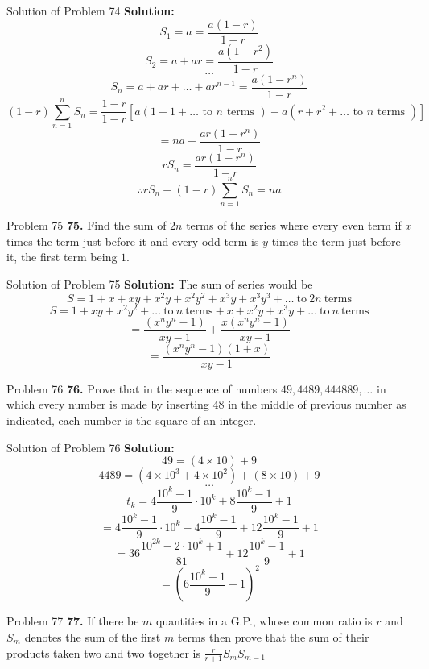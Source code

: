 \documentclass[aspectratio=1610,8pt]{beamer}
\begin{document}
\begin{frame}{Solution of Problem 74}
  \textbf{Solution:} $$S_1 = a = \frac{a(1 - r)}{1 - r}$$
  $$S_2 = a + ar = \frac{a(1 - r^2)}{1 - r}$$
  $$\ldots$$
  $$S_n = a + ar + \ldots + ar^{n - 1} = \frac{a(1 - r^n)}{1 - r}$$
  $$(1-r)\sum_{n = 1}^nS_n = \frac{1 - r}{1 - r}\left[a(1 + 1 + \ldots\text{~to~}n\text{~terms~}) -a (r + r^2 + \ldots
    \text{~to~}n\text{~terms~})\right]$$
  $$= na - \frac{ar(1 - r^n)}{1 - r}$$
  $$rS_n = \frac{ar(1 - r^n)}{1 - r}$$
  $$\therefore rS_n + (1 - r)\sum_{n = 1}^nS_n = na$$
\end{frame}
\begin{frame}{Problem 75}
  \textbf{75.} Find the sum of $2n$ terms of the series where every even term if $x$ times the term just before it and every odd
  term is $y$ times the term just before it, the first term being $1.$
\end{frame}
\begin{frame}{Solution of Problem 75}
  \textbf{Solution:} The sum of series would be $$S = 1 + x + xy + x^2y + x^2y^2 + x^3y + x^3y^3 + \ldots~\text{to}~2n~\text{terms}$$
  $$S = 1 + xy + x^2y^2 + \ldots~\text{to}~n~\text{terms} + x + x^2y + x^3y + \ldots~\text{to}~n~\text{terms}$$
  $$= \frac{(x^ny^n - 1)}{xy - 1} + \frac{x(x^ny^n - 1)}{xy - 1}$$
  $$= \frac{(x^ny^n - 1)(1 + x)}{xy - 1}$$
\end{frame}
\begin{frame}{Problem 76}
  \textbf{76.} Prove that in the sequence of numbers $49, 4489, 444889, \ldots$ in which every number is made by inserting $48$ in
  the middle of previous number as indicated, each number is the square of an integer.
\end{frame}
\begin{frame}{Solution of Problem 76}
  \textbf{Solution:}$$49 = (4\times 10) + 9$$
  $$4489 = (4\times10^3 + 4\times 10^2) + (8\times 10) + 9$$
  $$\ldots$$
  $$t_k = 4\frac{10^k-1}{9}\cdot 10^k + 8 \frac{10^k-1}{9} + 1$$
  $$= 4\frac{10^k-1}{9}\cdot 10^k - 4 \frac{10^k-1}{9} + 12 \frac{10^k-1}{9} + 1$$
  $$= 36 \frac{10^{2k} - 2\cdot 10^k + 1}{81} + 12\frac{10^k-1}{9} + 1$$
  $$= \left(6\frac{10^k-1}{9}+1\right)^2$$
\end{frame}
\begin{frame}{Problem 77}
  \textbf{77.} If there be $m$ quantities in a G.P., whose common ratio is $r$ and $S_m$ denotes the sum of the first $m$ terms
  then prove that the sum of their products taken two and two together is $\frac{r}{r + 1}S_mS_{m - 1}$
\end{frame}
\end{document}
